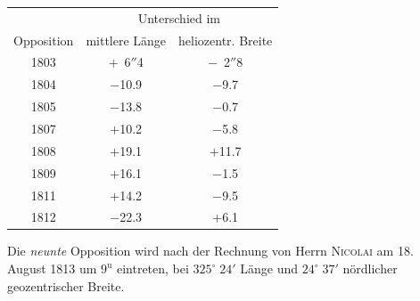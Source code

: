 \begin{center}
\fontsize{10}{12}\selectfont\setlength{\tabcolsep}{7pt}\renewcommand{\arraystretch}{1.15}\begin{tabular}{c|c|c}
 & \multicolumn{2}{c}{Unterschied im} \\
Opposition & mittlere Länge & heliozentr. Breite \\
\hline
1803 & $+$\ 6$''$4  & $-$\ 2$''$8 \\
1804 & $-$10.9 & $-$9.7 \\
1805 & $-$13.8 & $-$0.7 \\
1807 & $+$10.2 & $-$5.8 \\
1808 & $+$19.1 & $+$11.7 \\
1809 & $+$16.1 & $-$1.5 \\
1811 & $+$14.2 & $-$9.5 \\
1812 & $-$22.3 & $+$6.1 \\
\end{tabular}
\end{center}

\par\indent Die \emph{neunte} Opposition wird nach der Rechnung von Herrn \textsc{Nicolai} am 18. August 1813 um $9^{\mathrm u}$ eintreten, bei $325^\circ\;24'$ Länge und $24^\circ\;37'$ nördlicher geozentrischer Breite.
